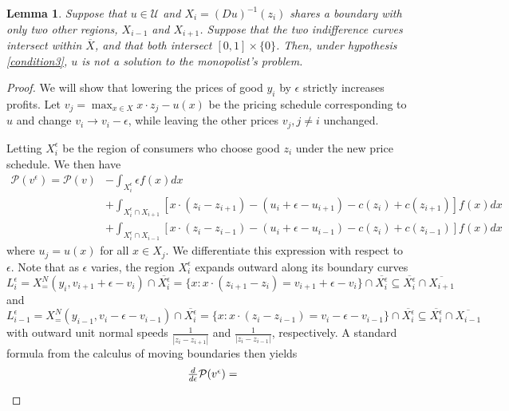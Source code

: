 \documentclass[12pt,reqno]{amsart}
\newtheorem{lem}{Lemma}
\begin{document}
\begin{lem}\label{case1}
         Suppose that $u \in \mathcal{U}$ and $X_i =(Du)^{-1}(z_i)$ shares a boundary with only two other regions, $X_{i-1}$ and $X_{i+1}$.  Suppose that the two indifference curves intersect within $\overline{X}$, and that both intersect $[0,1]\times\{0\}$.  Then, under hypothesis   \ref{condition3}, $u$ is not a solution to the monopolist's problem.   
    \end{lem}
\begin{proof}We will show that lowering the prices of good $y_i$ by $\epsilon$ strictly increases profits.  Let $v_j = \max_{x \in X}x \cdot z_j - u(x)$ be the pricing schedule corresponding to $u$ and change $v_i \rightarrow v_i -\epsilon$, while leaving the other prices $v_j, j \neq i$ unchanged.

Letting $X_i^\epsilon$ be the region of consumers who choose good $z_i$ under the new price schedule.  We then have
\[\begin{array}{ll}
    \mathcal P(v^\epsilon) = \mathcal P(v)&-\int_{X_i^\epsilon} \epsilon f(x) dx\\
    &+ \int_{X_{i}^\epsilon \cap X_{i+1}}[x \cdot (z_{i}-z_{i+1}) - (u_{i}+\epsilon-u_{i+1}) -c(z_{i}) +c(z_{i+1}) ]f(x)dx \\
    &+ \int_{X_{i}^\epsilon \cap X_{i-1}} [x \cdot (z_{i}-z_{i-1}) - (u_{i}+\epsilon-u_{i-1}) -c(z_{i}) +c(z_{i-1})]
    f(x) dx 
\end{array}\]
where $u_j=u(x)$ for all $x\in X_j.$
 We differentiate this expression with respect to $\epsilon$.  Note that as $\epsilon$ varies, the region $X_i^\epsilon$ expands outward along its boundary curves 
$$
 L_i^\epsilon=X^N_=(y_i, v_{i+1} +\epsilon -v_{i})\cap \overline{ X^\epsilon_i} =\{x: x\cdot (z_{i+1}-z_i) =v_{i+1} +\epsilon -v_{i}\} \cap \overline{ X^\epsilon_i} \subseteq \overline{  X_{i}^\epsilon} \cap \overline{X_{i+1}}
 $$ 
 and 
 $$
 L_{i-1}^\epsilon= X^N_=(y_{i-1}, v_{i} -\epsilon -v_{i-1})\cap \overline{ X^\epsilon_i} =\{x: x\cdot (z_{i}-z_{i-1}) =v_{i} -\epsilon -v_{i-1}\} \cap \overline{ X^\epsilon_i} \subseteq\overline{  X_{i}^\epsilon} \cap \overline{X_{i-1}}
 $$
 with outward unit normal speeds $\frac{1}{|z_i-z_{i+1}|}$ and $\frac{1}{|z_i-z_{i-1}|}$, respectively.  A standard formula from the calculus of moving boundaries then yields 
 \[\begin{array}{ll}
     &\frac{d}{d\epsilon} \mathcal P(v^\epsilon)  =\vspace{3pt}\\

\end{array}\]
\end{proof}
\end{document}
